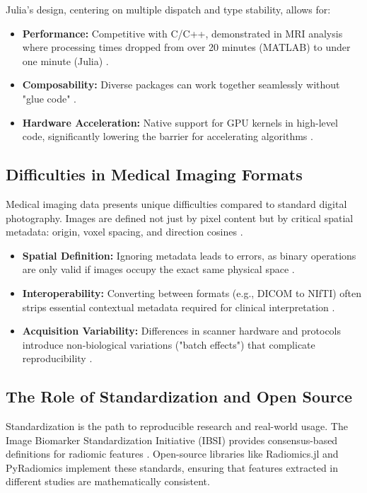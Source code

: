\documentclass[preprint,12pt]{elsarticle}
\begin{document}
Julia's design, centering on multiple dispatch and type stability, allows for:
\begin{itemize}
    \item \textbf{Performance:} Competitive with C/C++, demonstrated in MRI analysis where processing times dropped from over 20 minutes (MATLAB) to under one minute (Julia) \cite{SiscoWang2021}.
    \item \textbf{Composability:} Diverse packages can work together seamlessly without "glue code" \cite{RoeschGreener2023}.
    \item \textbf{Hardware Acceleration:} Native support for GPU kernels in high-level code, significantly lowering the barrier for accelerating algorithms \cite{AhnRoss2015, HeideBerg2024}.
\end{itemize}

\subsection{Difficulties in Medical Imaging Formats}

Medical imaging data presents unique difficulties compared to standard digital photography. Images are defined not just by pixel content but by critical spatial metadata: origin, voxel spacing, and direction cosines \cite{YanivLowekamp2017}.
\begin{itemize}
    \item \textbf{Spatial Definition:} Ignoring metadata leads to errors, as binary operations are only valid if images occupy the exact same physical space \cite{YanivLowekamp2017}.
    \item \textbf{Interoperability:} Converting between formats (e.g., DICOM to NIfTI) often strips essential contextual metadata required for clinical interpretation \cite{BridgeGorman2022}.
    \item \textbf{Acquisition Variability:} Differences in scanner hardware and protocols introduce non-biological variations ("batch effects") that complicate reproducibility \cite{SchurinkKranen2021}.
\end{itemize}

\subsection{The Role of Standardization and Open Source}

Standardization is the path to reproducible research and real-world usage. The Image Biomarker Standardization Initiative (IBSI) provides consensus-based definitions for radiomic features \cite{BettinelliBranchini2020}. Open-source libraries like Radiomics.jl and PyRadiomics \cite{GriethuysenFedorov2017} implement these standards, ensuring that features extracted in different studies are mathematically consistent.
\end{document}
